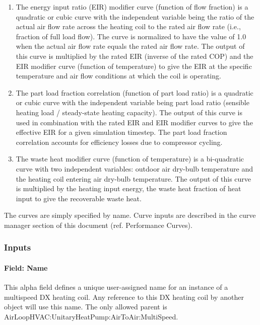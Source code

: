 \begin{enumerate}
\item
  The energy input ratio (EIR) modifier curve (function of flow fraction) is a quadratic or cubic curve with the independent variable being the ratio of the actual air flow rate across the heating coil to the rated air flow rate (i.e., fraction of full load flow). The curve is normalized to have the value of 1.0 when the actual air flow rate equals the rated air flow rate. The output of this curve is multiplied by the rated EIR (inverse of the rated COP) and the EIR modifier curve (function of temperature) to give the EIR at the specific temperature and air flow conditions at which the coil is operating.
\item
  The part load fraction correlation (function of part load ratio) is a quadratic or cubic curve with the independent variable being part load ratio (sensible heating load / steady-state heating capacity). The output of this curve is used in combination with the rated EIR and EIR modifier curves to give the effective EIR for a given simulation timestep. The part load fraction correlation accounts for efficiency losses due to compressor cycling.
\item
  The waste heat modifier curve (function of temperature) is a bi-quadratic curve with two independent variables: outdoor air dry-bulb temperature and the heating coil entering air dry-bulb temperature. The output of this curve is multiplied by the heating input energy, the waste heat fraction of heat input to give the recoverable waste heat.
\end{enumerate}

The curves are simply specified by name. Curve inputs are described in the curve manager section of this document (ref. Performance Curves).

\subsubsection{Inputs}\label{inputs-20-001}

\paragraph{Field: Name}\label{field-name-19-001}

This alpha field defines a unique user-assigned name for an instance of a multispeed DX heating coil. Any reference to this DX heating coil by another object will use this name. The only allowed parent is AirLoopHVAC:UnitaryHeatPump:AirToAir:MultiSpeed.


